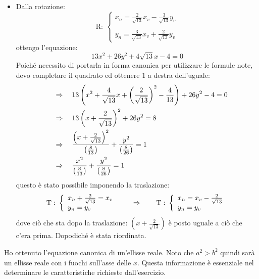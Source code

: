 \documentclass[a4paper, oneside]{article}
\begin{document}
\begin{itemize}
				\item Dalla rotazione:
				\begin{equation*}
					\mathrm{R:}\ \left\{
					\begin{array}{l}
						x_n = \displaystyle \frac{2}{\sqrt{13}} x_v - \frac{3}{\sqrt{13}} y_v \\ \\
						y_n = \displaystyle \frac{3}{\sqrt{13}} x_v + \frac{2}{\sqrt{13}} y_v
					\end{array} \right.
				\end{equation*}
				ottengo l'equazione:
				\begin{equation*}
					13x^2+26y^2+4\sqrt{13}x-4=0
				\end{equation*}
				Poiché necessito di portarla in forma canonica per utilizzare le formule note, devo completare il quadrato ed ottenere $1$ a destra dell'uguale:
				\begin{align*}
					\quad &\Rightarrow \quad 13\left(x^2+\frac{4}{\sqrt{13}}x+\left(\frac{2}{\sqrt{13}}\right)^2-\frac{4}{13}\right)+26y^2-4=0 \\ 
					\quad &\Rightarrow \quad 13\left(x+\frac{2}{\sqrt{13}}\right)^2+26y^2=8 \\
					\quad &\Rightarrow \quad \frac{\left(x+\frac{2}{\sqrt{13}}\right)^2}{\left(\frac{8}{13}\right)}+\frac{y^2}{\left(\frac{8}{26}\right)}=1 \\
					\quad &\Rightarrow \quad \frac{x^2}{\left(\frac{8}{13}\right)}+\frac{y^2}{\left(\frac{8}{26}\right)}=1 \\
				\end{align*}
				questo è stato possibile imponendo la traslazione:
				\begin{equation*}
					\mathrm{T:}\ \left\{
					\begin{array}{l}
						x_n + \frac{2}{\sqrt{13}} = x_v \\
						y_n = y_v
					\end{array} \right. \qquad \Rightarrow \qquad
					\mathrm{T:}\ \left\{
					\begin{array}{l}
						x_n = x_v - \frac{2}{\sqrt{13}} \\
						y_n = y_v
					\end{array} \right.
				\end{equation*}
				dove ciò che sta dopo la traslazione: $ \left(x + \frac{2}{\sqrt{13}}\right)$ è posto uguale a ciò che c'era prima. Dopodiché è stata riordinata.
			\end{itemize}
			Ho ottenuto l'equazione canonica di un'ellisse reale. Noto che $a^2>b^2$ quindi sarà un ellisse reale con i fuochi sull'asse delle $x$. Questa informazione è essenziale nel determinare le caratteristiche richieste dall'esercizio.
\end{document}
